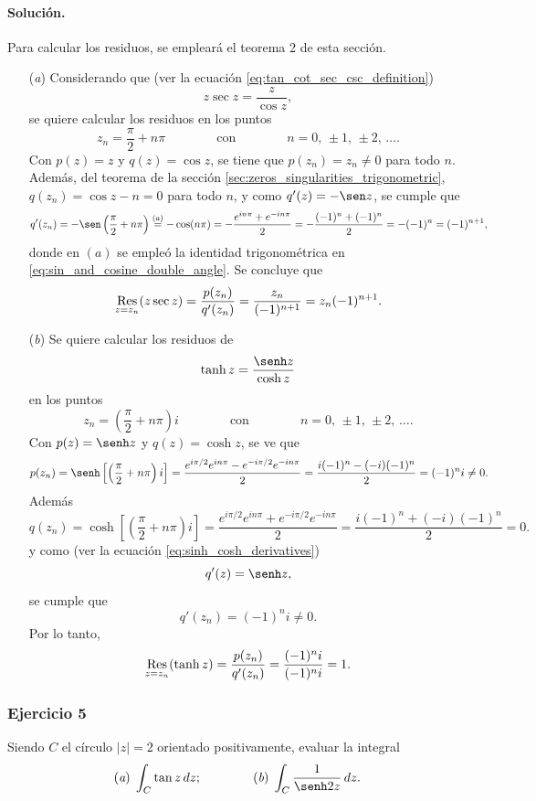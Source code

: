 \documentclass[a4paper]{report}
\def\Res{\qopname\relax m{Res}}
\begin{document}
\paragraph{Solución.} 

Para calcular los residuos, se empleará el teorema 2 de esta sección.

\begin{enumerate}
 \item[(\textit{a})] Considerando que (ver la ecuación \ref{eq:tan_cot_sec_csc_definition})
 \[
  z\sec z=\frac{z}{\cos z},
 \]
 se quiere calcular los residuos en los puntos
 \[
  z_n=\frac{\pi}{2}+n\pi 
  \qquad\qquad\textrm{con}\qquad\qquad
  n=0,\,\pm1,\,\pm2,\,\dots.
 \]
 Con \(p(z)=z\) y \(q(z)=\cos z\), se tiene que \(p(z_n)=z_n\neq0\) para todo \(n\). Además, del teorema de la sección \ref{sec:zeros_singularities_trigonometric}, \(q(z_n)=\cos z-n=0\) para todo \(n\), y como
 \(q'(z)=-\sen z\),  se cumple que
 \[
  q'(z_n)=-\sen\left(\frac{\pi}{2}+n\pi\right)\overset{(a)}{=}-\cos(n\pi)=-\frac{e^{in\pi}+e^{-in\pi}}{2}
   =-\frac{(-1)^n+(-1)^n}{2}=-(-1)^n=(-1)^{n+1},
 \]
 donde en \((a)\) se empleó la identidad trigonométrica en \ref{eq:sin_and_cosine_double_angle}. Se concluye que 
 \[
  \Res_{z=z_n}(z\sec z)=\frac{p(z_n)}{q'(z_n)}=\frac{z_n}{(-1)^{n+1}}=z_n(-1)^{n+1}.
 \]
 \item[(\textit{b})] Se quiere calcular los residuos de
 \[
  \tanh z=\frac{\senh z}{\cosh z}
 \]
 en los puntos
 \[
  z_n=\left(\frac{\pi}{2}+n\pi\right)i 
  \qquad\qquad\textrm{con}\qquad\qquad
  n=0,\,\pm1,\,\pm2,\,\dots.
 \]
 Con \(p(z)=\senh z\) y \(q(z)=\cosh z\),  se ve que 
 \[
  p(z_n)=\senh\left[\left(\frac{\pi}{2}+n\pi\right)i\right]=\frac{e^{i\pi/2}e^{in\pi}-e^{-i\pi/2}e^{-in\pi}}{2}=\frac{i(-1)^n-(-i)(-1)^n}{2}=(-1)^ni\neq0.
 \]
 Además
 \[
  q(z_n)=\cosh\left[\left(\frac{\pi}{2}+n\pi\right)i\right]=\frac{e^{i\pi/2}e^{in\pi}+e^{-i\pi/2}e^{-in\pi}}{2}=\frac{i(-1)^n+(-i)(-1)^n}{2}=0.
 \]
 y como (ver la ecuación \ref{eq:sinh_cosh_derivatives})
 \[
  q'(z)=\senh z,
 \]
 se cumple que 
 \[
  q'(z_n)=(-1)^ni\neq0.
 \]
 Por lo tanto,
 \[
  \Res_{z=z_n}(\tanh z)=\frac{p(z_n)}{q'(z_n)}=\frac{(-1)^ni}{(-1)^ni}=1.
 \]
\end{enumerate}

\subsubsection{Ejercicio 5}

Siendo \(C\) el círculo \(|z|=2\) orientado positivamente, evaluar la integral
\[
 (\textit{a})\;\int_C\tan z\,dz;\qquad\qquad (\textit{b})\;\int_C\frac{1}{\senh 2z}\,dz.
\]
\end{document}
